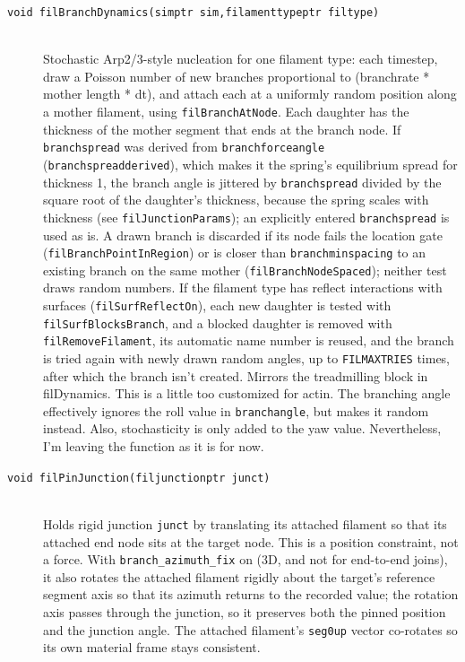 \documentclass {scrbook}
\newcommand {\ttt} {\texttt}
\begin{document}
\begin{description}
\item[\ttt{void filBranchDynamics(simptr sim,filamenttypeptr filtype)}]
\hfill \\
Stochastic Arp2/3-style nucleation for one filament type: each timestep, draw a Poisson number of new branches proportional to (branchrate * mother length * dt), and attach each at a uniformly random position along a mother filament, using \ttt{filBranchAtNode}. Each daughter has the thickness of the mother segment that ends at the branch node. If \ttt{branchspread} was derived from \ttt{branchforceangle} (\ttt{branchspreadderived}), which makes it the spring's equilibrium spread for thickness 1, the branch angle is jittered by \ttt{branchspread} divided by the square root of the daughter's thickness, because the spring scales with thickness (see \ttt{filJunctionParams}); an explicitly entered \ttt{branchspread} is used as is. A drawn branch is discarded if its node fails the location gate (\ttt{filBranchPointInRegion}) or is closer than \ttt{branchminspacing} to an existing branch on the same mother (\ttt{filBranchNodeSpaced}); neither test draws random numbers. If the filament type has reflect interactions with surfaces (\ttt{filSurfReflectOn}), each new daughter is tested with \ttt{filSurfBlocksBranch}, and a blocked daughter is removed with \ttt{filRemoveFilament}, its automatic name number is reused, and the branch is tried again with newly drawn random angles, up to \ttt{FILMAXTRIES} times, after which the branch isn't created. Mirrors the treadmilling block in filDynamics. This is a little too customized for actin. The branching angle effectively ignores the roll value in \ttt{branchangle}, but makes it random instead. Also, stochasticity is only added to the yaw value. Nevertheless, I'm leaving the function as it is for now. %

\item[\ttt{void filPinJunction(filjunctionptr junct)}]
\hfill \\
Holds rigid junction \ttt{junct} by translating its attached filament so that its attached end node sits at the target node. This is a position constraint, not a force. With \ttt{branch\_azimuth\_fix} on (3D, and not for end-to-end joins), it also rotates the attached filament rigidly about the target's reference segment axis so that its azimuth returns to the recorded value; the rotation axis passes through the junction, so it preserves both the pinned position and the junction angle. The attached filament's \ttt{seg0up} vector co-rotates so its own material frame stays consistent.


\end{description}
\end{document}
